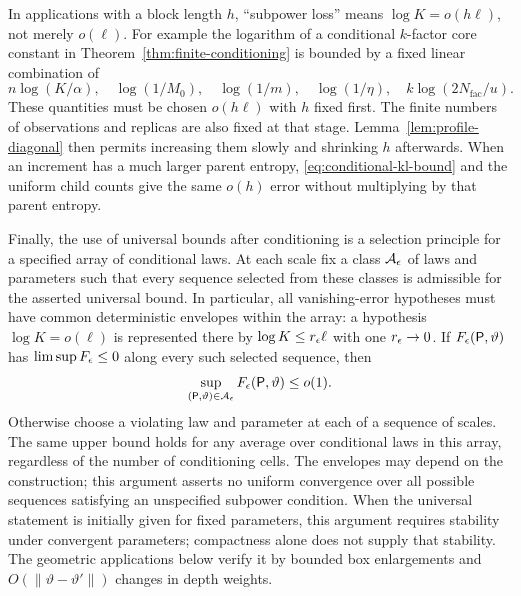 In applications with a block length $h$, ``subpower loss'' means
$\log K=o(h\ell)$, not merely $o(\ell)$.
For example the logarithm of a conditional $k$-factor core constant
in Theorem~\ref{thm:finite-conditioning} is bounded by a fixed
linear combination of
\[
 n\log(K/\alpha),\quad\log(1/M_0),\quad\log(1/m),\quad
 \log(1/\eta),\quad k\log(2N_{\mathrm{fac}}/u).
\]
These quantities must be chosen $o(h\ell)$ with $h$ fixed first.
The finite numbers of observations and replicas are also fixed at
that stage.  Lemma~\ref{lem:profile-diagonal} then permits increasing
them slowly and shrinking $h$ afterwards.  When an increment has a
much larger parent entropy, \eqref{eq:conditional-kl-bound} and the
uniform child counts give the same $o(h)$ error without multiplying
by that parent entropy.

Finally, the use of universal bounds after conditioning is a selection
principle for a specified array of conditional laws.  At each scale
fix a class $\mathcal A_\epsilon$ of laws and parameters such that every
sequence selected from these classes is admissible for the asserted
universal bound.  In particular, all vanishing-error hypotheses must
have common deterministic envelopes within the array: a hypothesis
$\log K=o(\ell)$ is represented there by
$\log K\le r_\epsilon\ell$ with one $r_\epsilon\to0$.
If $F_\epsilon(\mathsf P,\vartheta)$ has
$\limsup F_\epsilon\le0$ along every such selected sequence, then
\[
 \sup_{(\mathsf P,\vartheta)\in\mathcal A_\epsilon}
               F_\epsilon(\mathsf P,\vartheta)\le o(1).
\]
Otherwise choose a violating law and parameter at each of a sequence
of scales.  The same upper bound holds for any average over
conditional laws in this array, regardless of the number of
conditioning cells.  The envelopes may depend on the construction;
this argument asserts no uniform convergence over all possible
sequences satisfying an unspecified subpower condition.
When the universal statement is initially given for fixed parameters,
this argument requires stability under convergent parameters;
compactness alone does not supply that stability.  The geometric
applications below verify it by bounded box enlargements and
$O(\|\vartheta-\vartheta'\|)$ changes in depth weights.
